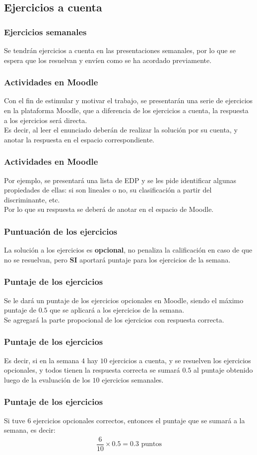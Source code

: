 \subsection{Ejercicios a cuenta}
\begin{frame}
\frametitle{Ejercicios semanales}
Se tendrán ejercicios a cuenta en las presentaciones semanales, por lo que se espera que los resuelvan y envíen como se ha acordado previamente.
\end{frame}
\begin{frame}
\frametitle{Actividades en Moodle}
Con el fin de estimular y motivar el trabajo, se presentarán una serie de ejercicios en la plataforma Moodle, que a diferencia de los ejercicios a cuenta, la respuesta a los ejercicios será directa.
\\
\bigskip
Es decir, al leer el enunciado deberán de realizar la solución por su cuenta, y anotar la respuesta en el espacio correspondiente.
\end{frame}
\begin{frame}
\frametitle{Actividades en Moodle}
Por ejemplo, se presentará una lista de EDP y se les pide identificar algunas propiedades de ellas: si son lineales o no, su clasificación a partir del discriminante, etc.
\\
\bigskip
Por lo que su respuesta se deberá de anotar en el espacio de Moodle.
\end{frame}
\begin{frame}
\frametitle{Puntuación de los ejercicios}
La solución a los ejercicios es \textbf{opcional}, no penaliza la calificación en caso de que no se resuelvan, pero \textbf{SI} aportará puntaje para los ejercicios de la semana.
\end{frame}
\begin{frame}
\frametitle{Puntaje de los ejercicios}
Se le dará un puntaje de los ejercicios opcionales en Moodle, siendo el máximo puntaje de $0.5$ que se aplicará a los ejercicios de la semana.
\\
\bigskip
\pause
Se agregará la parte propocional de los ejercicios con respuesta correcta.
\end{frame}
\begin{frame}
\frametitle{Puntaje de los ejercicios}
Es decir, si en la semana $4$ hay $10$ ejercicios a cuenta, y se resuelven los ejercicios opcionales, y todos tienen la respuesta correcta se sumará $0.5$ al puntaje obtenido luego de la evaluación de los $10$ ejercicios semanales.
\end{frame}
\begin{frame}
\frametitle{Puntaje de los ejercicios}
Si tuve 6 ejercicios opcionales correctos, entonces el puntaje que se sumará a la semana, es decir: 
\begin{align*}
\dfrac{6}{10} \times 0.5 = 0.3 \mbox{ puntos}
\end{align*}
\end{frame}
